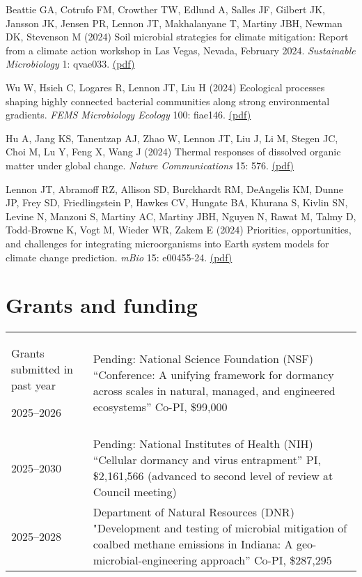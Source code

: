 \documentclass[11pt]{article}
\begin{document}
\begin{etaremune}
\item Beattie GA, Cotrufo FM, Crowther TW, Edlund A, Salles JF, Gilbert JK, Jansson JK, Jensen PR, Lennon JT, Makhalanyane T, Martiny JBH, Newman DK, Stevenson M (2024) Soil microbial strategies for climate mitigation: Report from a climate action workshop in Las Vegas, Nevada, February 2024. \textit{Sustainable Microbiology} 1: qvae033. \href{https://lennonlab.github.io/assets/publications/Beattie_etal_2024.pdf}{(pdf)}

\item Wu W, Hsieh C, Logares R, Lennon JT, Liu H (2024) Ecological processes shaping highly connected bacterial communities along strong environmental gradients. \textit{FEMS Microbiology Ecology} 100: fiae146. \href{https://lennonlab.github.io/assets/publications/Wu_etal_2024.pdf}{(pdf)}

\item Hu A, Jang KS, Tanentzap AJ, Zhao W, Lennon JT, Liu J, Li M, Stegen JC, Choi M, Lu Y, Feng X, Wang J (2024) Thermal responses of dissolved organic matter under global change. \textit{Nature Communications} 15: 576. \href{https://lennonlab.github.io/assets/publications/Hu_etal_2024.pdf}{(pdf)}

\item Lennon JT, Abramoff RZ, Allison SD, Burckhardt RM, DeAngelis KM, Dunne JP, Frey SD, Friedlingstein P, Hawkes CV, Hungate BA, Khurana S, Kivlin SN, Levine N, Manzoni S, Martiny AC, Martiny JBH, Nguyen N, Rawat M, Talmy D, Todd-Browne K, Vogt M, Wieder WR, Zakem E (2024) Priorities, opportunities, and challenges for integrating microorganisms into Earth system models for climate change prediction. \textit{mBio} 15: e00455-24. \href{https://lennonlab.github.io/assets/publications/Lennon_etal_2024.pdf}{(pdf)}

\end{etaremune}

\section*{Grants and funding}

\vspace{-1.25em}
\noindent
\begin{tabularx}{\textwidth}{@{}l@{\hspace{2em}}X@{}}
Grants submitted in past year

2025--2026	& Pending: National Science Foundation (NSF) “Conference: A unifying framework for dormancy across scales in natural, managed, and engineered ecosystems” Co-PI, \$99,000\\

2025--2030	& Pending: National Institutes of Health (NIH) “Cellular dormancy and virus entrapment” PI, \$2,161,566 (advanced to second level of review at Council meeting)\\ 

2025--2028 & Department of Natural Resources (DNR) "Development and testing of microbial mitigation of coalbed methane emissions in Indiana: A geo-microbial-engineering approach” Co-PI, \$287,295 \\


\end{tabularx}
\end{document}
